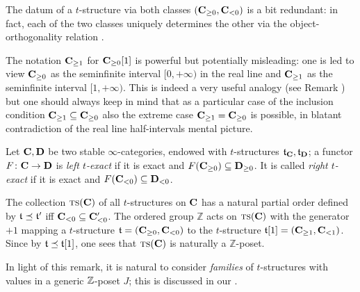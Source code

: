 \begin{remark}\label{determines.the.other}
The datum of a $t$\hyp{}structure via both classes $(\mathbf{C}_{\ge 0}, \mathbf{C}_{<0})$ is a bit redundant: in fact, each of the two classes uniquely determines the other via the object\hyp{}orthogonality relation .
\end{remark}
\begin{remark}
\marginnote{\textdbend}
The notation $\mathbf{C}_{\geq 1}$ for $\mathbf{C}_{\geq 0}[1]$ is powerful but potentially misleading: one is led to view $\mathbf{C}_{\geq 0}$ as the seminfinite interval $[0,+\infty)$ in the real line and $\mathbf{C}_{\geq 1}$ as the seminfinite interval $[1,+\infty)$. This is indeed a very useful analogy (see Remark ) but one should always keep in mind that as a particular case of the inclusion condition $\mathbf{C}_{\geq 1}\subseteq \mathbf{C}_{\geq 0}$ also the extreme case $\mathbf{C}_{\geq 1}=\mathbf{C}_{\geq 0}$ is possible, in blatant contradiction of the real line half\hyp{}intervals mental picture.
\end{remark}
\begin{definition}\label{t.exact.func}
Let $\mathbf{C},\mathbf{D}$ be two stable $\infty$\hyp{}categories, endowed with $t$\hyp{}structures $\mathfrak{t}_{\mathbf{C}},\mathfrak{t}_{\mathbf{D}}$; a functor $F\colon \mathbf{C} \to \mathbf{D}$ is \emph{left $t$\hyp{}exact} if it is exact and $F(\mathbf{C}_{\ge 0})\subseteq \mathbf{D}_{\ge 0}$. It is called \emph{right $t$\hyp{}exact} if it is exact and $F(\mathbf{C}_{< 0})\subseteq \mathbf{D}_{< 0}$.
\end{definition}
\begin{remark}\label{slicing}
The collection $\text{\scshape ts}(\mathbf{C})$ of all $t$\hyp{}structures on $\mathbf{C}$ has a natural partial order defined by $\mathfrak{t}\preceq \mathfrak{t}'$ iff $\mathbf{C}_{<0}\subseteq \mathbf{C}'_{<0}$. The ordered group $\mathbb{Z}$ acts  on $\text{\scshape ts}(\mathbf{C})$ with the generator  $+1$ mapping a $t$\hyp{}structure $\mathfrak{t}=(\mathbf{C}_{\geq0},\mathbf{C}_{<0})$ to the $t$\hyp{}structure $\mathfrak{t}[1]=(\mathbf{C}_{\geq 1},\mathbf{C}_{<1})$. Since by  $\mathfrak{t}\preceq\mathfrak{t}[1]$, one sees that $\text{\scshape ts}(\mathbf{C})$ is naturally a $\mathbb{Z}$\hyp{}poset.
\end{remark}
In light of this remark, it is natural to consider \emph{families} of $t$\hyp{}structures with values in a generic $\mathbb{Z}$\hyp{}poset $J$; this is discussed in our \achap {}.
